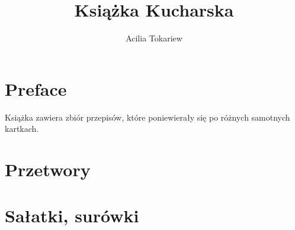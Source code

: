 \documentclass[14pt,twoside,parskip=half*]{scrbook}
\title{Książka Kucharska}
\author{Acilia Tokariew}
\begin{document}
\frontmatter{}
\maketitle{}
\tableofcontents{}
\chapter{Preface}
Książka zawiera zbiór przepisów, które poniewierały się po różnych samotnych
kartkach.

\mainmatter{}

\chapter{Przetwory}

\label{ch:przetwory}

\chapter{Sałatki, surówki}

\label{ch:salatki-surowki}
\end{document}
